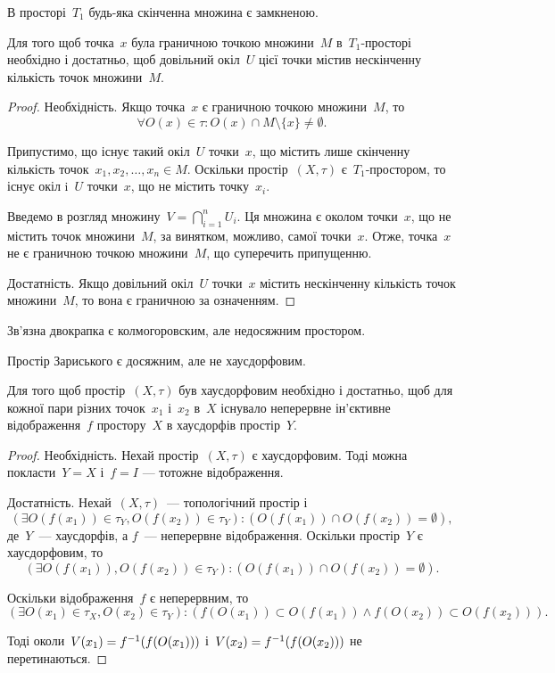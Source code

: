 \begin{corollary}
В просторі~$T_1$ будь-яка скінченна множина є
замкненою.
\end{corollary}

\begin{theorem}
Для того щоб точка~$x$ була граничною
точкою множини~$M$ в~$T_1$-просторі необхідно і достатньо,
щоб довільний окіл~$U$ цієї точки містив нескінченну
кількість точок множини~$M$.
\end{theorem}

\begin{proof}
Необхідність. Якщо точка~$x$ є граничною
точкою множини~$M$, то \[ \forall O(x) \in \tau: O(x) \cap M \setminus \{x\} \ne \emptyset. \]

Припустимо, що існує такий окіл~$U$ точки~$x$, що містить
лише скінченну кількість точок~$x_1, x_2, \ldots, x_n \in M$. Оскільки
простір~$(X, \tau)$ є~$T_1$-простором, то існує окіл i~$U$ точки~$x$, що
не містить точку~$x_i$.

Введемо в розгляд множину~$V = \bigcap_{i = 1}^n U_i$.
Ця множина є околом точки~$x$, що не містить точок
множини~$M$, за винятком, можливо, самої точки~$x$. Отже,
точка~$x$ не є граничною точкою множини~$M$, що
суперечить припущенню.

Достатність. Якщо довільний окіл~$U$ точки~$x$ містить
нескінченну кількість точок множини~$M$, то вона є
граничною за означенням.
\end{proof}

\begin{example}
Зв'язна двокрапка є колмогоровским, але
недосяжним простором.
\end{example}

\begin{example}
Простір Зариського є досяжним, але не
хаусдорфовим.
\end{example}

\begin{theorem}
Для того щоб
простір~$(X, \tau)$ був хаусдорфовим необхідно і достатньо,
щоб для кожної пари різних точок~$x_1$ і~$x_2$ в~$X$ існувало
неперервне ін'єктивне відображення~$f$ простору~$X$ в
хаусдорфів простір~$Y$.
\end{theorem}

\begin{proof}
Необхідність. Нехай простір~$(X, \tau)$ є
хаусдорфовим. Тоді можна покласти~$Y = X$ і~$f = I$ ---
тотожне відображення.

Достатність. Нехай~$(X, \tau)$~--- топологічний простір і
\[ (\exists O(f(x_1)) \in \tau_Y, O(f(x_2)) \in \tau_Y): (O(f(x_1)) \cap O(f(x_2)) = \emptyset), \]
де~$Y$~--- хаусдорфів, а
$f$~--- неперервне відображення. Оскільки простір~$Y$ є
хаусдорфовим, то
\[ (\exists O(f(x_1)), O(f(x_2)) \in \tau_Y): (O(f(x_1)) \cap O(f(x_2)) = \emptyset). \]

Оскільки відображення~$f$ є неперервним, то
\[ (\exists O(x_1) \in \tau_X, O(x_2) \in \tau_Y): (f(O(x_1)) \subset O(f(x_1)) \land f(O(x_2)) \subset O(f(x_2))). \]

Тоді околи~$V(x_1) = f^{-1}(f(O(x_1)))$ і~$V(x_2) = f^{-1}(f(O(x_2)))$
не перетинаються.
\end{proof}

